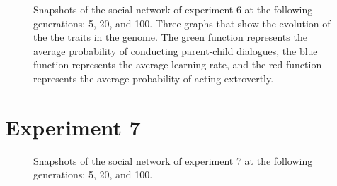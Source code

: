 \begin{figure}[htbp]
    \caption[Snapshots of the social network of experiment 6 at the following generations: 5, 20, and 100, and graphs showing the evolution of the the traits in the genome.]{Snapshots of the social network of experiment 6 at the following generations:  5,  20, and  100.  Three graphs that show the evolution of the the traits in the genome. The green function represents the average probability of conducting parent-child dialogues, the blue function represents the average learning rate, and the red function represents the average probability of acting extrovertly.}
\end{figure}

\clearpage
\section{Experiment 7}
\begin{figure}[htbp]
    \centering
    \hfill
    \par \bigskip
    \caption[Snapshots of the social network of experiment 7 at the following generations: 5, 20, and 100.]{Snapshots of the social network of experiment 7 at the following generations:  5,  20, and  100.}
\end{figure}
